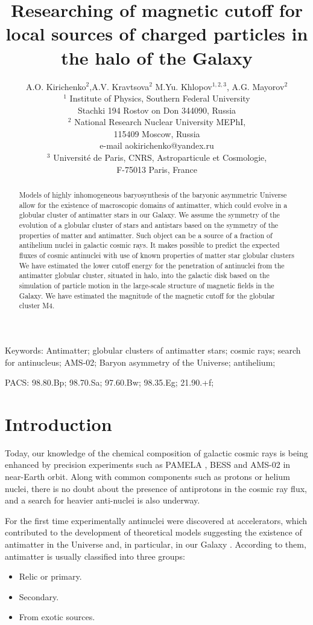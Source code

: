 \documentclass{article}
\title{Researching of magnetic cutoff for local sources of charged particles in the halo of the Galaxy}
\author{A.O. Kirichenko$^{2}$,A.V. Kravtsova$^{2}$ M.Yu. Khlopov$^{1,2,3}$, A.G. Mayorov$^{2}$\\
$^{1}$ Institute of Physics, Southern Federal University\\ Stachki 194 Rostov on Don 344090, Russia\\
$^{2}$ National Research Nuclear University MEPhI,\\ 115409 Moscow, Russia\\e-mail aokirichenko@yandex.ru\\
$^{3}$  Université de Paris, CNRS, Astroparticule et Cosmologie,\\ F-75013 Paris, France}
\begin{document}
\maketitle

\begin{abstract}
Models of highly inhomogeneous baryosynthesis of the baryonic asymmetric Universe allow for the existence of macroscopic domains of antimatter, which could evolve in a globular cluster of antimatter stars in our Galaxy. We assume the symmetry of the evolution of a globular cluster of stars and antistars based on the symmetry of the properties of matter and antimatter. Such object can be a source of a fraction of antihelium nuclei in galactic cosmic rays. It makes possible to predict the expected fluxes of cosmic antinuclei with use of known properties of matter star globular clusters
 We have estimated the lower cutoff energy for the penetration of antinuclei from the antimatter globular cluster, situated in halo, into the galactic disk based on the simulation of particle motion in the large-scale structure of magnetic fields in the Galaxy. We have estimated the magnitude of the magnetic cutoff for the globular cluster M4.

\end{abstract}

\noindent Keywords: Antimatter;  globular clusters of antimatter stars; cosmic rays; search for antinucleus; AMS-02; Baryon asymmetry of the Universe; antihelium;

\noindent PACS: 98.80.Bp; 98.70.Sa; 97.60.Bw; 98.35.Eg; 21.90.+f; 

\section{Introduction}\label{s:intro}
Today, our knowledge of the chemical composition of galactic cosmic rays is being enhanced by precision experiments such as PAMELA \cite{PAMELA}, BESS \cite{BESS} and AMS-02 \cite{AMS} in near-Earth orbit. Along with common components such as protons or helium nuclei, there is no doubt about the presence of antiprotons in the cosmic ray flux, and a search for heavier anti-nuclei is also underway.

For the first time experimentally antinuclei were discovered at accelerators, which contributed to the development of theoretical models suggesting the existence of antimatter in the Universe and, in particular, in our Galaxy \cite{experiments}. According to them, antimatter is usually classified into three groups:
\begin{itemize}
\item Relic or primary.
\item Secondary.
\item From exotic sources.
\end{itemize}
\end{document}
